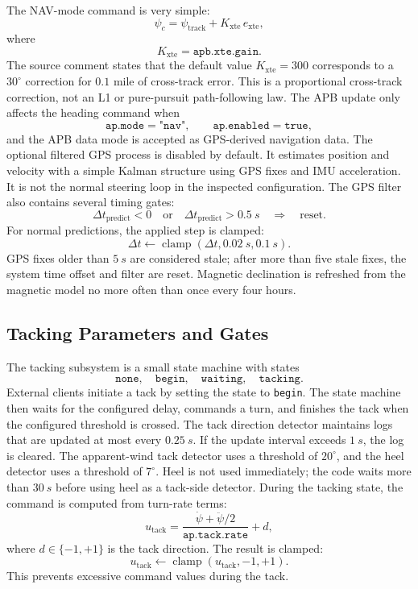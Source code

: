 \documentclass[10pt,twocolumn]{article}
\begin{document}
The NAV-mode command is very simple:
\[
\psi_c
=
\psi_{\mathrm{track}}
+
K_{\mathrm{xte}}\,e_{\mathrm{xte}},
\]
where
\[
K_{\mathrm{xte}} = \texttt{apb.xte.gain}.
\]
The source comment states that the default value \(K_{\mathrm{xte}}=300\)
corresponds to a \(30^\circ\) correction for \(0.1\) mile of cross-track
error.  This is a proportional cross-track correction, not an L1 or
pure-pursuit path-following law.
The APB update only affects the heading command when
\[
\texttt{ap.mode}=\texttt{"nav"},
\qquad
\texttt{ap.enabled}=\texttt{true},
\]
and the APB data mode is accepted as GPS-derived navigation data.
The optional filtered GPS process is disabled by default.  It estimates
position and velocity with a simple Kalman structure using GPS fixes and
IMU acceleration.  It is not the normal steering loop in the inspected
configuration.
The GPS filter also contains several timing gates:
\[
\Delta t_{\mathrm{predict}} < 0
\quad\text{or}\quad
\Delta t_{\mathrm{predict}} > \SI{0.5}{s}
\quad\Longrightarrow\quad
\text{reset}.
\]
For normal predictions, the applied step is clamped:
\[
\Delta t
\leftarrow
\operatorname{clamp}(\Delta t,\SI{0.02}{s},\SI{0.1}{s}).
\]
GPS fixes older than \(\SI{5}{s}\) are considered stale; after more than
five stale fixes, the system time offset and filter are reset.  Magnetic
declination is refreshed from the magnetic model no more often than once
every four hours.
\subsection{Tacking Parameters and Gates}
The tacking subsystem is a small state machine with states
\[
\texttt{none},\quad
\texttt{begin},\quad
\texttt{waiting},\quad
\texttt{tacking}.
\]
External clients initiate a tack by setting the state to
\texttt{begin}.  The state machine then waits for the configured delay,
commands a turn, and finishes the tack when the configured threshold is
crossed.
The tack direction detector maintains logs that are updated at most every
\(\SI{0.25}{s}\).  If the update interval exceeds \(\SI{1}{s}\), the log
is cleared.  The apparent-wind tack detector uses a threshold of
\(20^\circ\), and the heel detector uses a threshold of \(7^\circ\).  Heel
is not used immediately; the code waits more than \(\SI{30}{s}\) before
using heel as a tack-side detector.
During the tacking state, the command is computed from turn-rate terms:
\[
u_{\mathrm{tack}}
=
\frac{\dot{\psi}+\ddot{\psi}/2}
{\texttt{ap.tack.rate}}
+
d,
\]
where \(d\in\{-1,+1\}\) is the tack direction.  The result is clamped:
\[
u_{\mathrm{tack}}
\leftarrow
\operatorname{clamp}(u_{\mathrm{tack}},-1,+1).
\]
This prevents excessive command values during the tack.
\end{document}
